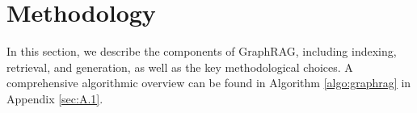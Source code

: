 \documentclass[11pt]{article}
\begin{document}
\section{Methodology}

In this section, we describe the components of GraphRAG, including indexing, retrieval, and generation, as well as the key methodological choices. A comprehensive algorithmic overview can be found in Algorithm \ref{algo:graphrag} in Appendix \ref{sec:A.1}.


 


\end{document}
